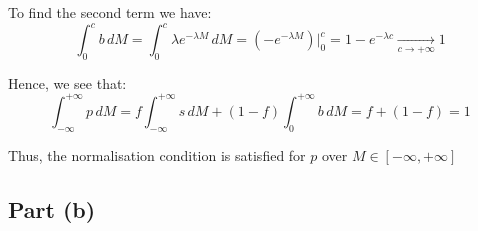 \documentclass{article}
\begin{document}
To find the second term we have:
\[
\int_{0}^{c} b \, dM =
\int_{0}^{c} \lambda e^{-\lambda M} \, dM =
(-e^{-\lambda M}) |_0^{c} =
1 - e^{-\lambda c}
\xrightarrow[c \to +\infty]{} 1
\]

Hence, we see that:
\[ 
\int_{-\infty}^{+\infty} p \, dM = 
f\int_{-\infty}^{+\infty} s \, dM + 
(1-f)\int_{0}^{+\infty} b \, dM =
f + (1-f) = 1
\]

Thus, the normalisation condition is satisfied for $p$ over $M \in [-\infty, +\infty]$

\subsection*{Part (b)}
\end{document}
